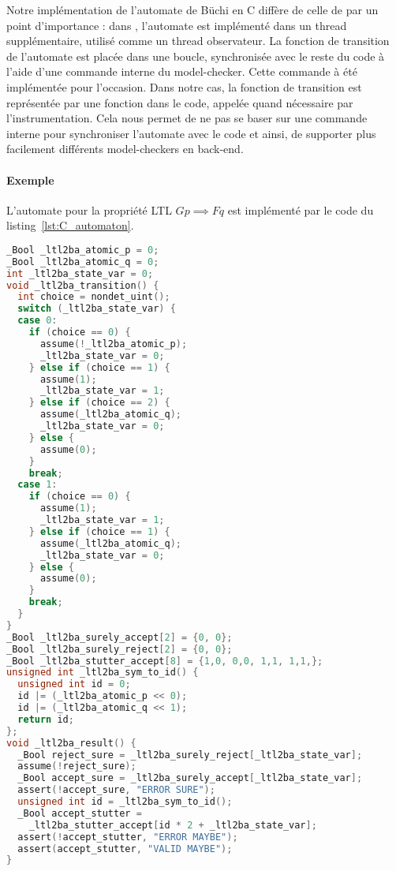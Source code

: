 Notre implémentation de l'automate de Büchi en C diffère de celle de
\cite{morse_ltl} par un point d'importance : dans \cite{morse_ltl}, l'automate
est implémenté dans un thread supplémentaire, utilisé comme un thread
observateur. La fonction de transition de l'automate est placée dans une boucle,
synchronisée avec le reste du code à l'aide d'une commande interne du
model-checker. Cette commande à été implémentée pour l'occasion. Dans notre cas,
la fonction de transition est représentée par une fonction dans le code, appelée
quand nécessaire par l'instrumentation. Cela nous permet de ne pas se baser sur
une commande interne pour synchroniser l'automate avec le code et ainsi, de
supporter plus facilement différents model-checkers en back-end.

\paragraph{Exemple}
L'automate pour la propriété LTL \(G p \implies F q\) est implémenté par
le code du listing~\ref{lst:C_automaton}.

\begin{lstlisting}[language=C, frame=single, label=lst:C_automaton,
    caption=Code de l'automate représentant \(G p \implies F q\)]
_Bool _ltl2ba_atomic_p = 0;
_Bool _ltl2ba_atomic_q = 0;
int _ltl2ba_state_var = 0;
void _ltl2ba_transition() {
  int choice = nondet_uint();
  switch (_ltl2ba_state_var) {
  case 0:
    if (choice == 0) {
      assume(!_ltl2ba_atomic_p);
      _ltl2ba_state_var = 0;
    } else if (choice == 1) {
      assume(1);
      _ltl2ba_state_var = 1;
    } else if (choice == 2) {
      assume(_ltl2ba_atomic_q);
      _ltl2ba_state_var = 0;
    } else {
      assume(0);
    }
    break;
  case 1:
    if (choice == 0) {
      assume(1);
      _ltl2ba_state_var = 1;
    } else if (choice == 1) {
      assume(_ltl2ba_atomic_q);
      _ltl2ba_state_var = 0;
    } else {
      assume(0);
    }
    break;
  }
}
_Bool _ltl2ba_surely_accept[2] = {0, 0};
_Bool _ltl2ba_surely_reject[2] = {0, 0};
_Bool _ltl2ba_stutter_accept[8] = {1,0, 0,0, 1,1, 1,1,};
unsigned int _ltl2ba_sym_to_id() {
  unsigned int id = 0;
  id |= (_ltl2ba_atomic_p << 0);
  id |= (_ltl2ba_atomic_q << 1);
  return id;
};
void _ltl2ba_result() {
  _Bool reject_sure = _ltl2ba_surely_reject[_ltl2ba_state_var];
  assume(!reject_sure);
  _Bool accept_sure = _ltl2ba_surely_accept[_ltl2ba_state_var];
  assert(!accept_sure, "ERROR SURE");
  unsigned int id = _ltl2ba_sym_to_id();
  _Bool accept_stutter =
    _ltl2ba_stutter_accept[id * 2 + _ltl2ba_state_var];
  assert(!accept_stutter, "ERROR MAYBE");
  assert(accept_stutter, "VALID MAYBE");
}
\end{lstlisting}

